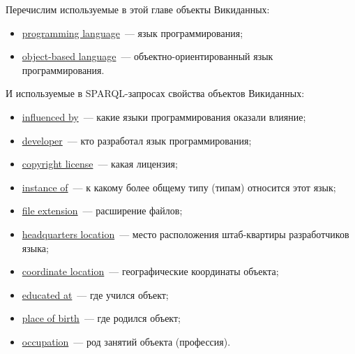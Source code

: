     Перечислим используемые в этой главе объекты Викиданных:
\begin{itemize}
	\item\href{https://www.wikidata.org/wiki/Q9143}{programming language}~--- язык программирования;
	\item\href{https://www.wikidata.org/wiki/Q899523}{object-based language}~--- объектно-ориентированный язык программирования.
\end{itemize}
И используемые в SPARQL-запросах свойства объектов Викиданных:
\begin{itemize}
	\item\href{https://www.wikidata.org/wiki/Property:P737}{influenced by}~--- какие языки программирования оказали влияние;
	\item\href{https://www.wikidata.org/wiki/Property:P178}{developer}~--- кто разработал язык программирования;
	\item\href{https://www.wikidata.org/wiki/Property:P275}{copyright license}~--- какая лицензия;
	\item\href{https://www.wikidata.org/wiki/Property:P31}{instance of}~--- к какому более общему типу (типам) относится этот язык;
	\item\href{https://www.wikidata.org/wiki/Property:P1195}{file extension}~--- расширение файлов;
	\item\href{https://www.wikidata.org/wiki/Property:P159}{headquarters location}~--- место расположения штаб-квартиры разработчиков языка;
	\item\href{https://www.wikidata.org/wiki/Property:P625}{coordinate location}~--- географические координаты объекта;
	\item\href{https://www.wikidata.org/wiki/Property:P69}{educated at}~--- где учился объект;
	\item\href{https://www.wikidata.org/wiki/Property:P19}{place of birth}~--- где родился объект;
	\item\href{https://www.wikidata.org/wiki/Property:P106}{occupation}~--- род занятий объекта (профессия).
\end{itemize}



